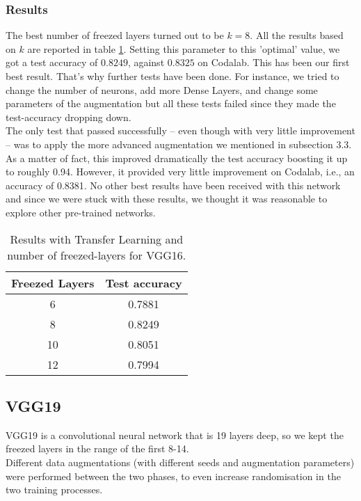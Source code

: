 \documentclass[11pt]{article}
\begin{document}
\subsubsection{Results}
The best number of freezed layers turned out to be $k=8$. All the results based on $k$ are reported in table \ref{vgg16_results}. Setting this parameter to this 'optimal' value, we got a test accuracy of $0.8249$, against $0.8325$ on Codalab. This has been our first best result. That's why further tests have been done. For instance, we tried to change the number of neurons, add more Dense Layers, and change some parameters of the augmentation but all these tests failed since they made the test-accuracy dropping down.\\[0.1cm]
The only test that passed successfully -- even though with very little improvement -- was to apply the more advanced augmentation we mentioned in subsection 3.3. As a matter of fact, this improved dramatically the test accuracy boosting it up to roughly 0.94. However, it provided very little improvement on Codalab, i.e., an accuracy of 0.8381. No other best results have been received with this network and since we were stuck with these results, we thought it was reasonable to explore other pre-trained networks.
\begin{table}[ht]
  \centering
  \begin{adjustbox}{width=150}
  \small
\begin{tabular}{|c|c|}

\hline \bf Freezed Layers & \bf Test accuracy \\ \hline
6 & 0.7881 \\
8 & 0.8249 \\
10 & 0.8051 \\
12 & 0.7994 \\

\hline
\end{tabular}
\end{adjustbox}
\caption{Results with Transfer Learning and number of freezed-layers for VGG16.}
\label{vgg16_results}
\end{table}
\subsection{VGG19}
VGG19 is a convolutional neural network that is 19 layers deep, so we kept the freezed layers in the range of the first 8-14. \\[0.1cm]
Different data augmentations (with different seeds and augmentation parameters) were performed between the two phases, to even increase randomisation in the two training processes.
\end{document}
